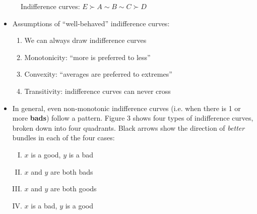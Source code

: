 \documentclass{article}
\begin{document}
\begin{itemize}
\begin{figure}[h!]
\caption{Indifference curves: $E \succ A \sim B \sim C \succ D$}
\end{figure}
	\begin{itemize}
		\item Assumptions of ``well-behaved'' indifference curves: 
		\begin{enumerate}
			\item We can always draw indifference curves
			\item Monotonicity: ``more is preferred to less''
			\item Convexity: ``averages are preferred to extremes''
			\item Transitivity: indifference curves can never cross
		\end{enumerate}
		\clearpage
		\item In general, even non-monotonic indifference curves (i.e. when there is 1 or more \textbf{bads}) follow a pattern. Figure 3 shows four types of indifference curves, broken down into four quadrants. Black arrows show the direction of \emph{better} bundles in each of the four cases: 
		\begin{enumerate}[I.]
			\item $x$ is a good, $y$ is a bad
			\item $x$ and $y$ are both bads
			\item $x$ and $y$ are both goods
			\item $x$ is a bad, $y$ is a good 
		\end{enumerate}
	\begin{figure}[h!]
		\centering 	
\end{figure}
\end{itemize}
\end{itemize}
\end{document}
